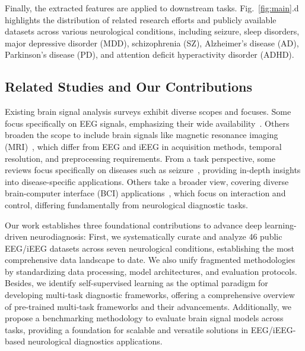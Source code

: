 Finally, the extracted features are applied to downstream tasks. Fig.~\ref{fig:main}.d highlights the distribution of related research efforts and publicly available datasets across various neurological conditions, including seizure, sleep disorders, major depressive disorder (MDD), schizophrenia (SZ), Alzheimer's disease (AD), Parkinson's disease (PD), and attention deficit hyperactivity disorder (ADHD).

\subsection{Related Studies and Our Contributions}

Existing brain signal analysis surveys exhibit diverse scopes and focuses.
Some focus specifically on EEG signals, emphasizing their wide availability~\cite{roy2019deep, amrani2021eeg, amer2023eeg}. 
Others broaden the scope to include brain signals like magnetic resonance imaging (MRI)~\cite{zhang2021survey, khan2021machine}, which differ from EEG and iEEG in acquisition methods, temporal resolution, and preprocessing requirements.
From a task perspective, some reviews focus specifically on diseases such as seizure~\cite{shoeibi2021epileptic, rahul2024systematic}, providing in-depth insights into disease-specific applications. 
Others take a broader view, covering diverse brain-computer interface (BCI) applications~\cite{hossain2023status, weng2024self}, which focus on interaction and control, differing fundamentally from neurological diagnostic tasks. 

Our work establishes three foundational contributions to advance deep learning-driven neurodiagnosis: 
First, we systematically curate and analyze 46 public EEG/iEEG datasets across seven neurological conditions, establishing the most comprehensive data landscape to date. We also unify fragmented methodologies by standardizing data processing, model architectures, and evaluation protocols.
Besides, we identify self-supervised learning as the optimal paradigm for developing multi-task diagnostic frameworks, offering a comprehensive overview of pre-trained multi-task frameworks and their advancements.
Additionally, we propose a benchmarking methodology to evaluate brain signal models across tasks, providing a foundation for scalable and versatile solutions in EEG/iEEG-based neurological diagnostics applications.